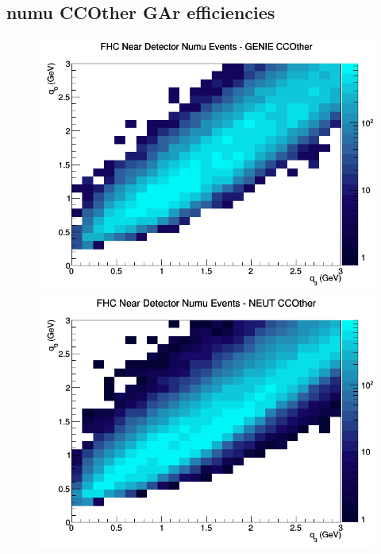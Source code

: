 \subsection{numu CCOther GAr efficiencies}
\begin{figure}[h]
\includegraphics[width=\linewidth]{eff_q0_q3/GAr/CCOther_FHC_ND_numu_q3_q0_GENIE.png}
\endminipage
{}
\includegraphics[width=\linewidth]{eff_q0_q3/GAr/CCOther_FHC_ND_numu_q3_q0_NEUT.png}
\endminipage
{}

\end{figure}
